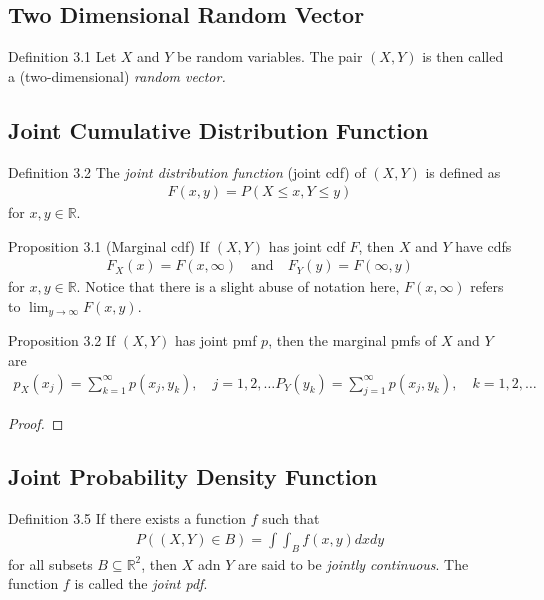 \subsection{Two Dimensional Random Vector}
\begin{boks}{Definition 3.1}
Let $X$ and $Y$ be random variables. The pair $(X,Y)$ is then called a (two-dimensional) \textit{random vector.}
\end{boks}

\subsection{Joint Cumulative Distribution Function}
\begin{boks}{Definition 3.2}
The \textit{joint distribution function} (joint cdf) of $(X,Y)$ is defined as
\begin{align*}
    F(x,y) = P(X \leq x, Y \leq y)
\end{align*}
for $x,y \in \mathbb{R}$.
\end{boks}

\begin{boks}{Proposition 3.1 (Marginal cdf)}
If $(X, Y)$ has joint cdf $F$, then $X$ and $Y$ have cdfs
\begin{align*}
    F_X(x) = F(x, \infty) \quad \text{and} \quad F_Y(y) = F(\infty, y)
\end{align*}
for $x,y \in \mathbb{R}$. Notice that there is a slight abuse of notation here, $F(x,\infty)$ refers to $\lim_{y \rightarrow \infty} F(x, y)$.
\end{boks}

\begin{boks}{Proposition 3.2}
  If $(X, Y)$ has joint pmf $p$, then the marginal pmfs of $X$ and $Y$ are
  \begin{align*}
    p_X(x_j) = \sum_{k = 1}^\infty p(x_j, y_k), \quad j = 1, 2, \ldots
    P_Y(y_k) = \sum_{j = 1}^\infty p(x_j, y_k), \quad k = 1, 2, \ldots
  \end{align*}
\end{boks}
\begin{proof}

\end{proof}

\subsection{Joint Probability Density Function}
\begin{boks}{Definition 3.5}
If there exists a function $f$ such that
\begin{align*}
    P((X, Y)\in B) = \int\int_B f(x, y) dx dy
\end{align*}
for all subsets $B\subseteq \mathbb{R}^2$, then $X$ adn $Y$ are said to be \textit{jointly continuous}. The function $f$ is called the \textit{joint pdf}.
\end{boks}

